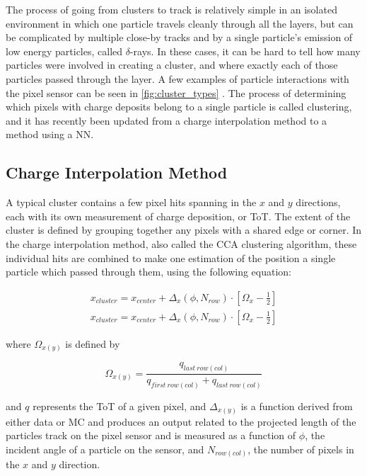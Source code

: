 The process of going from clusters to track is relatively simple in an isolated environment in which one particle travels cleanly through all the layers, but can be complicated by multiple close-by tracks and by a single particle's emission of low energy particles, called $\delta$-rays. In these cases, it can be hard to tell how many particles were involved in creating a cluster, and where exactly each of those particles passed through the layer. A few examples of particle interactions with the pixel sensor can be seen in \autoref{fig:cluster_types} . The process of determining which pixels with charge deposits belong to a single particle is called clustering, and it has recently been updated from a charge interpolation method to a method using a \ac{NN}. 

\subsection{Charge Interpolation Method}

A typical cluster contains a few pixel hits spanning in the $x$ and $y$ directions, each with its own measurement of charge deposition, or \ac{ToT}. The extent of the cluster is defined by grouping together any pixels with a shared edge or corner. In the charge interpolation method, also called the \ac{CCA} clustering algorithm, these individual hits are combined to make one estimation of the position a single particle which passed through them, using the following equation: 

\begin{eqnarray}
x_{cluster} = x_{center} + \Delta_x(\phi,N_{row}) \cdot \left[ \Omega_x -\frac{1}{2} \right] \\
\label{eq:analogx}
x_{cluster} = x_{center} + \Delta_x(\phi,N_{row}) \cdot \left[ \Omega_x -\frac{1}{2} \right]
\label{eq:analogy}
\end{eqnarray}

where $\Omega_{x(y)}$ is defined by

\begin{equation}
\Omega_{x(y)} = \frac{q_{last~row(col)}}{q_{first~row(col)} + q_{last~row(col)}}
\end{equation}

and $q$ represents the \ac{ToT} of a given pixel, and $\Delta_{x(y)}$ is a function derived from either data or \ac{MC} and produces an output related to the projected length of the particles track on the pixel sensor and is measured as a function of $\phi$, the incident angle of a particle on the sensor, and $N_{row(col)}$, the number of pixels in the $x$ and $y$ direction. 

